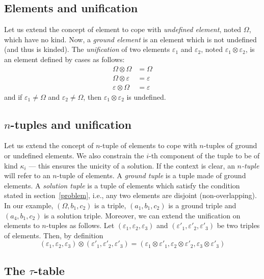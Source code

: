 \subsection{Elements and unification}

Let us extend the concept of element to cope with \emph{undefined
  element}, noted \(\Omega\), which have no kind. Now, a \emph{ground
  element} is an element which is not undefined (and thus is
kinded). The \emph{unification} of two elements \(\varepsilon_1\) and
\(\varepsilon_2\), noted \(\varepsilon_1 \otimes \varepsilon_2\), is
an element defined by cases as follows:
\begin{align*}
   \Omega \otimes \Omega &= \Omega\\
   \Omega \otimes \varepsilon &= \varepsilon\\
   \varepsilon \otimes \Omega &= \varepsilon
\end{align*}
\noindent
and if \(\varepsilon_1 \neq \Omega\) and \(\varepsilon_2 \neq
\Omega\), then \(\varepsilon_1 \otimes \varepsilon_2\) is undefined.


\subsection{\(n\)-tuples and unification}

Let us extend the concept of \(n\)-tuple of elements to cope with
\(n\)-tuples of ground or undefined elements. We also constrain the
\(i\)-th component of the tuple to be of kind \(\kappa_i\) --- this
ensures the unicity of a solution. If the context is clear, an
\emph{\(n\)-tuple} will refer to an \(n\)-tuple of elements. A
\emph{ground tuple} is a tuple made of ground elements. A
\emph{solution tuple} is a tuple of elements which satisfy the
condition stated in section~\ref{problem}, i.e., any two elements are
disjoint (non-overlapping). In our example, \((\Omega, b_1, c_2)\) is
a triple, \((a_1, b_1, c_2)\) is a ground triple and \((a_4, b_1,
c_2)\) is a solution triple. Moreover, we can extend the unification
on elements to \(n\)-tuples as follows. Let \((\varepsilon_1,
\varepsilon_2, \varepsilon_3)\) and \((\varepsilon'_1, \varepsilon'_2,
\varepsilon'_3)\) be two triples of elements. Then, by definition
\[
(\varepsilon_1, \varepsilon_2, \varepsilon_3) \otimes (\varepsilon'_1,
\varepsilon'_2, \varepsilon'_3) = (\varepsilon_1 \otimes
\varepsilon'_1, \varepsilon_2 \otimes \varepsilon'_2, \varepsilon_3
\otimes \varepsilon'_3)
\]


\subsection{The \(\tau\)-table}
\label{tau_table}

